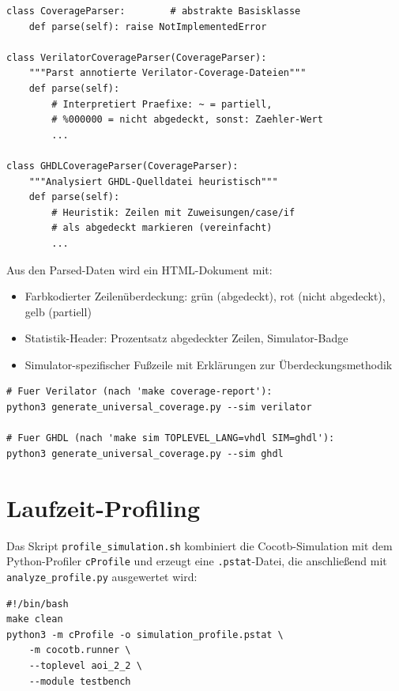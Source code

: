 ﻿\documentclass[12pt,a4paper]{report}
\begin{document}
\begin{lstlisting}[style=pythonstyle, caption={Abstrakte Parser-Hierarchie für universelle Coverage-Berichte}]
class CoverageParser:        # abstrakte Basisklasse
    def parse(self): raise NotImplementedError

class VerilatorCoverageParser(CoverageParser):
    """Parst annotierte Verilator-Coverage-Dateien"""
    def parse(self):
        # Interpretiert Praefixe: ~ = partiell,
        # %000000 = nicht abgedeckt, sonst: Zaehler-Wert
        ...

class GHDLCoverageParser(CoverageParser):
    """Analysiert GHDL-Quelldatei heuristisch"""
    def parse(self):
        # Heuristik: Zeilen mit Zuweisungen/case/if
        # als abgedeckt markieren (vereinfacht)
        ...
\end{lstlisting}

Aus den Parsed-Daten wird ein HTML-Dokument mit:
\begin{itemize}
    \item Farbkodierter Zeilenüberdeckung: grün (abgedeckt), rot (nicht abgedeckt),
          gelb (partiell)
    \item Statistik-Header: Prozentsatz abgedeckter Zeilen, Simulator-Badge
    \item Simulator-spezifischer Fußzeile mit Erklärungen zur Überdeckungsmethodik
\end{itemize}

\begin{lstlisting}[style=bashstyle, caption={Aufruf des universellen Überdeckungsberichts}]
# Fuer Verilator (nach 'make coverage-report'):
python3 generate_universal_coverage.py --sim verilator

# Fuer GHDL (nach 'make sim TOPLEVEL_LANG=vhdl SIM=ghdl'):
python3 generate_universal_coverage.py --sim ghdl
\end{lstlisting}

\section{Laufzeit-Profiling}
\label{subsec:profiling}

Das Skript \texttt{profile\_simulation.sh} kombiniert die Cocotb-Simulation
mit dem Python-Profiler \texttt{cProfile} und erzeugt eine
\texttt{.pstat}-Datei, die anschließend mit \texttt{analyze\_profile\newline .py}
ausgewertet wird:

\begin{lstlisting}[style=bashstyle, caption={Simulations-Profiling mit cProfile}]
#!/bin/bash
make clean
python3 -m cProfile -o simulation_profile.pstat \
    -m cocotb.runner \
    --toplevel aoi_2_2 \
    --module testbench
\end{lstlisting}
\end{document}
